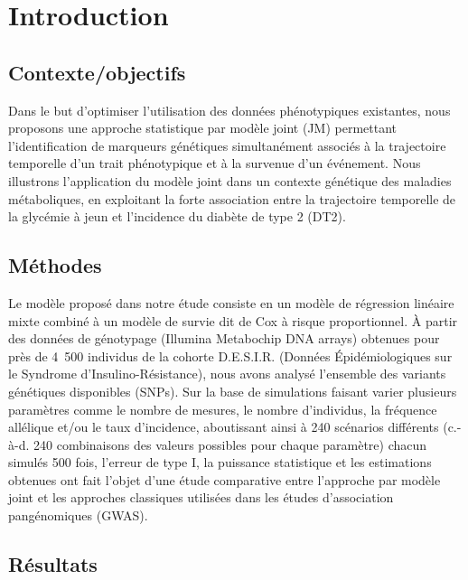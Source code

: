 \documentclass[11pt,a4paper,notrimn]{krantz}
\theoremstyle{definition}
\theoremstyle{definition}
\theoremstyle{remark}
\begin{document}
\section{Introduction}\label{introduction-1}

\subsection{Contexte/objectifs}\label{contexteobjectifs}

Dans le but d'optimiser l'utilisation des données phénotypiques
existantes, nous proposons une approche statistique par modèle joint
(JM) permettant l'identification de marqueurs génétiques simultanément
associés à la trajectoire temporelle d'un trait phénotypique et à la
survenue d'un événement. Nous illustrons l'application du modèle joint
dans un contexte génétique des maladies métaboliques, en exploitant la
forte association entre la trajectoire temporelle de la glycémie à jeun
et l'incidence du diabète de type 2 (DT2).

\subsection{Méthodes}\label{methodes}

Le modèle proposé dans notre étude consiste en un modèle de régression
linéaire mixte combiné à un modèle de survie dit de Cox à risque
proportionnel. À partir des données de génotypage (Illumina Metabochip
DNA arrays) obtenues pour près de 4~500 individus de la cohorte
D.E.S.I.R. (Données Épidémiologiques sur le Syndrome
d'Insulino-Résistance), nous avons analysé l'ensemble des variants
génétiques disponibles (SNPs). Sur la base de simulations faisant varier
plusieurs paramètres comme le nombre de mesures, le nombre d'individus,
la fréquence allélique et/ou le taux d'incidence, aboutissant ainsi à
240 scénarios différents (c.-à-d. 240 combinaisons des valeurs possibles
pour chaque paramètre) chacun simulés 500 fois, l'erreur de type I, la
puissance statistique et les estimations obtenues ont fait l'objet d'une
étude comparative entre l'approche par modèle joint et les approches
classiques utilisées dans les études d'association pangénomiques (GWAS).

\subsection{Résultats}\label{resultats}
\end{document}
